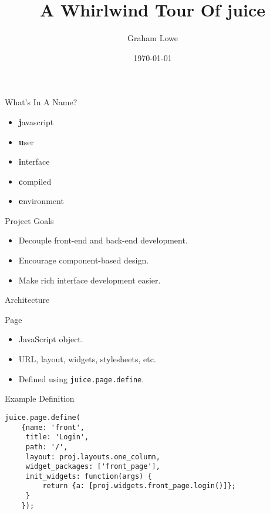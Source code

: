 \documentclass{beamer}
\title{A Whirlwind Tour Of juice}
\author{Graham Lowe}
\date{\today}
\begin{document}
\begin{frame}
  \titlepage
\end{frame}

\begin{frame}{What's In A Name?}

  \begin{itemize}
  \item
    \textbf{j}avascript
  \item
    \textbf{u}ser
  \item
    \textbf{i}nterface
  \item
    \textbf{c}ompiled
  \item
    \textbf{e}nvironment
  \end{itemize}
\end{frame}

\begin{frame}{Project Goals}
  \begin{itemize}
  \item
    Decouple front-end and back-end development.
  \item
    Encourage component-based design.
  \item
    Make rich interface development easier.
  \end{itemize}
\end{frame}

\begin{frame}{Architecture}
  \begin{centering}
    \par
  \end{centering}
\end{frame}

\begin{frame}{Page}
  \begin{itemize}
  \item JavaScript object.
  \item URL, layout, widgets, stylesheets, etc.
  \item Defined using \texttt{juice.page.define}.
  \end{itemize}
\end{frame}

\begin{frame}[fragile]{Example Definition}
\begin{verbatim}
juice.page.define(
    {name: 'front',
     title: 'Login',
     path: '/',
     layout: proj.layouts.one_column,
     widget_packages: ['front_page'],
     init_widgets: function(args) {
         return {a: [proj.widgets.front_page.login()]};
     }
    });
\end{verbatim}
\end{frame}
\end{document}
